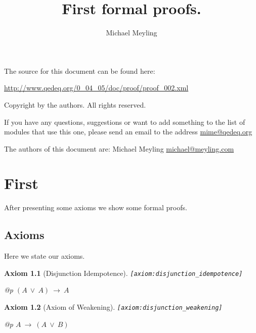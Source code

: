\documentclass[a4paper,german,10pt,twoside]{book}
\title{First formal proofs.}
\author{
Michael Meyling
}
\newtheorem{ax}{Axiom}
\theoremstyle{definition}
\theoremstyle{remark}
\begin{document}
\maketitle

\setlength{\parskip}{5pt plus 2pt minus 1pt}
\mbox{}
\vfill

\par
The source for this document can be found here:
\par
\url{http://www.qedeq.org/0_04_05/doc/proof/proof_002.xml}

\par
Copyright by the authors. All rights reserved.
\par
If you have any questions, suggestions or want to add something to the list of modules that use this one, please send an email to the address \href{mailto:mime@qedeq.org}{mime@qedeq.org}

\par
The authors of this document are:
Michael Meyling \href{mailto:michael@meyling.com}{michael@meyling.com}

\setlength{\parskip}{0pt}
\tableofcontents

\setlength{\parskip}{5pt plus 2pt minus 1pt}

\chapter{First} \label{chapter1} \hypertarget{chapter1}{}

After presenting some axioms we show some formal proofs.

\section{Axioms} \label{chapter1_section1} \hypertarget{chapter1_section1}{}
Here we state our axioms.

\begin{ax}[Disjunction Idempotence]
\label{axiom:disjunction_idempotence} \hypertarget{axiom:disjunction_idempotence}{}
{\tt \tiny [\verb]axiom:disjunction_idempotence]]}
\mbox{}
\begin{longtable}{{@{\extracolsep{\fill}}p{\linewidth}}}
\centering $(A\ \lor\ A)\ \rightarrow\ A$
\end{longtable}

\end{ax}


\begin{ax}[Axiom of Weakening]
\label{axiom:disjunction_weakening} \hypertarget{axiom:disjunction_weakening}{}
{\tt \tiny [\verb]axiom:disjunction_weakening]]}
\mbox{}
\begin{longtable}{{@{\extracolsep{\fill}}p{\linewidth}}}
\centering $A\ \rightarrow\ (A\ \lor\ B)$
\end{longtable}

\end{ax}
\end{document}
